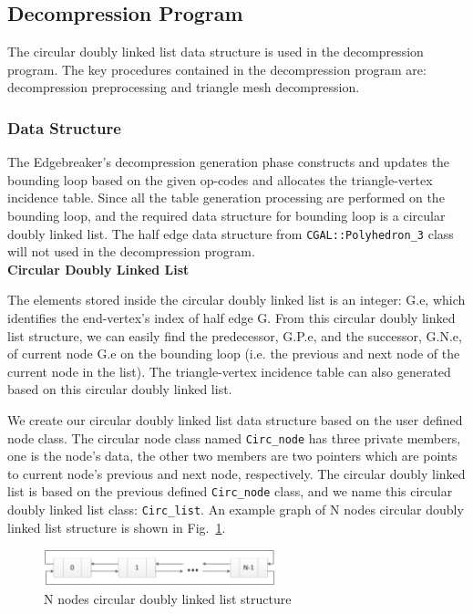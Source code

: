 \documentclass[onecolumn, 12pt]{article}
\begin{document}
\subsection{Decompression Program}
The circular doubly linked list data structure is used in the decompression program. The key procedures contained in the decompression program are: decompression preprocessing and triangle mesh decompression.


\subsubsection{Data Structure}
The Edgebreaker's decompression generation phase constructs and updates the bounding loop based on the given op-codes and allocates the triangle-vertex incidence table. Since all the table generation processing are performed on the bounding loop, and the required data structure for bounding loop is a circular doubly linked list. The half edge data structure from \lstinline!CGAL::Polyhedron_3! class will not used in the decompression program.\\

{\setlength\parindent{0pt}
\textbf{Circular Doubly Linked List}\vspace{0.5em}}

The elements stored inside the circular doubly linked list is an integer: G.e, which identifies the end-vertex's index of half edge G. From this circular doubly linked list structure, we can easily find the predecessor, G.P.e, and the successor, G.N.e, of current node G.e on the bounding loop (i.e. the previous and next node of the current node in the list). The triangle-vertex incidence table can also generated based on this  circular doubly linked list.

We create our circular doubly linked list data structure based on the user defined node class. The circular node class named \lstinline!Circ_node! has three private members, one is the node's data, the other two members are two pointers which are points to current node's previous and next node, respectively. The circular doubly linked list is based on the previous defined \lstinline!Circ_node! class, and we name this circular doubly linked list class: \lstinline!Circ_list!. An example graph of N nodes circular doubly linked list structure is shown in Fig.~\ref{fig:CircList}.

\begin{figure}[h]
\centering
\includegraphics[width=0.6\textwidth, clip, keepaspectratio]{fig_init_boundary.eps}
\caption{N nodes circular doubly linked list structure}\label{fig:CircList}
\end{figure}
\end{document}
